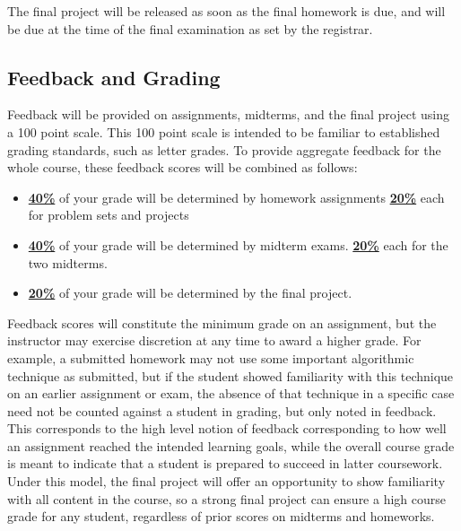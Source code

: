 \documentclass[11pt]{article}
\begin{document}
\bigskip
\noindent The final project will be released as soon as the final homework is due, and will be due at the time of the final examination as set 
by the registrar.

\subsection*{Feedback and Grading}
Feedback will be provided on assignments, midterms, and the final project using a 100 point scale.
This 100 point scale is intended to be familiar to established grading standards, such as letter grades. To provide aggregate feedback for the whole course, these feedback scores will be combined as follows:
\begin{itemize}
	\item \underline{\textbf{40\%}} of your grade will be determined by homework assignments
	\subitem \underline{\textbf{20\%}} each for problem sets and projects
	\item \underline{\textbf{40\%}} of your grade will be determined by midterm exams.
	\subitem \underline{\textbf{20\%}} each for the two midterms.
	\item \underline{\textbf{20\%}} of your grade will be determined by the final project.
\end{itemize}

\noindent Feedback scores will constitute the minimum grade on an assignment, but the instructor
may exercise discretion at any time to award a higher grade. For example, a submitted homework
may not use some important algorithmic technique as submitted, but if the student showed familiarity
with this technique on an earlier assignment or exam, the absence of that technique in a specific
case need not be counted against a student in grading, but only noted in feedback. This corresponds to the high level notion of feedback corresponding to how well an assignment reached the intended learning goals, while the overall course grade is meant to indicate that a student is prepared to succeed in latter coursework. Under this model, the final project will offer an opportunity to show familiarity with all content in the course, so a strong final project can ensure a high course grade
for any student, regardless of prior scores on midterms and homeworks.


\end{document}
